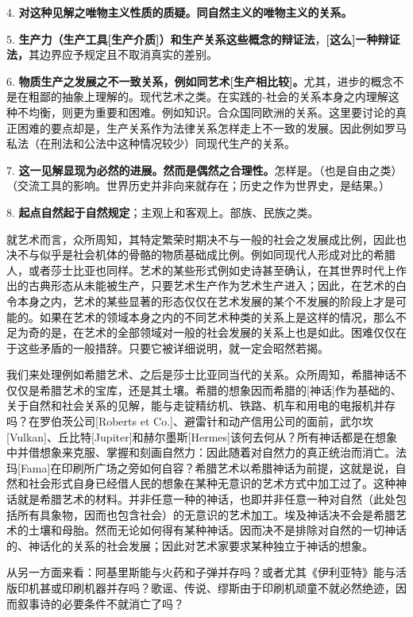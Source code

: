 \documentclass[a4paper,twoside,12pt]{ctexart}
\begin{document}
4. \textbf{对这种见解之唯物主义性质的质疑。同自然主义的唯物主义的关系。}

5. \textbf{生产力（生产工具[生产介质]）和生产关系这些概念的辩证法}，\textbf{[这么]一种辩证法，}其边界应予规定且不取消真实的差别。

6. \textbf{物质生产之发展之不一致关系，例如同艺术[生产相比较]。}尤其，进步的概念不是在粗鄙的抽象上理解的。现代艺术之类。在实践的-社会的关系本身之内理解这种不均衡，则更为重要和困难。例如知识。合众国同欧洲的关系。这里要讨论的真正困难的要点却是，生产关系作为法律关系怎样走上不一致的发展。因此例如罗马私法（在刑法和公法中这种情况较少）同现代生产的关系。

7. \textbf{这一见解显现为必然的进展。然而是偶然之合理性。}怎样是。（也是自由之类）（交流工具的影响。世界历史并非向来就存在；历史之作为世界史，是结果。）

8. \textbf{起点自然起于自然规定}；主观上和客观上。部族、民族之类。

就艺术而言，众所周知，其特定繁荣时期决不与一般的社会之发展成比例，因此也决不与似乎是社会机体的骨骼的物质基础成比例。例如同现代人形成对比的希腊人，或者莎士比亚也同样。艺术的某些形式例如史诗甚至确认，在其世界时代上作出的古典形态从未能被生产，只要艺术生产作为艺术生产进入；因此，在艺术的白令本身之内，艺术的某些显著的形态仅仅在艺术发展的某个不发展的阶段上才是可能的。如果在艺术的领域本身之内的不同艺术种类的关系上是这样的情况，那么不足为奇的是，在艺术的全部领域对一般的社会发展的关系上也是如此。困难仅仅在于这些矛盾的一般措辞。只要它被详细说明，就一定会昭然若揭。

我们来处理例如希腊艺术、之后是莎士比亚同当代的关系。众所周知，希腊神话不仅仅是希腊艺术的宝库，还是其土壤。希腊的想象因而希腊的[神话]作为基础的、关于自然和社会关系的见解，能与走锭精纺机、铁路、机车和用电的电报机并存吗？在罗伯茨公司[Roberts et Co.]、避雷针和动产信用公司的面前，武尔坎[Vulkan]、丘比特[Jupiter]和赫尔墨斯[Hermes]该何去何从？所有神话都是在想象中并借想象来克服、掌握和刻画自然力：因此随着对自然力的真正统治而消亡。法玛[Fama]在印刷所广场之旁如何自容？希腊艺术以希腊神话为前提，这就是说，自然和社会形式自身已经借人民的想象在某种无意识的艺术方式中加工过了。这种神话就是希腊艺术的材料。并非任意一种的神话，也即并非任意一种对自然（此处包括所有具象物，因而也包含社会）的无意识的艺术加工。埃及神话决不会是希腊艺术的土壤和母胎。然而无论如何得有某种神话。因而决不是排除对自然的一切神话的、神话化的关系的社会发展；因此对艺术家要求某种独立于神话的想象。

从另一方面来看：阿基里斯能与火药和子弹并存吗？或者尤其《伊利亚特》能与活版印机甚或印刷机器并存吗？歌谣、传说、缪斯由于印刷机顽童不就必然绝迹，因而叙事诗的必要条件不就消亡了吗？
\end{document}
